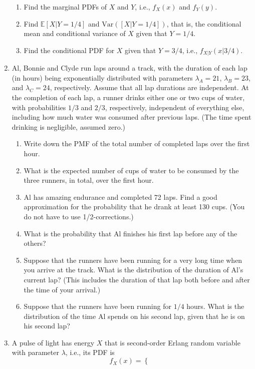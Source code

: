 \documentclass[a4paper,9pt,landscape]{extarticle}
\newcommand{\var}{\textrm{Var}}
\begin{document}
\begin{multicols*}{3}
\begin{enumerate}
\begin{enumerate}
		\item Find the marginal PDFs of $X$ and $Y$, i.e., $f_X(x)$ and $f_Y(y)$.
		\item Find $\mathds{E}\left[X|Y=1/4\right]$ and $\var(\left[X|Y=1/4\right])$, that is, the conditional mean and conditional variance of $X$ given that $Y=1/4$.
		\item Find the conditional PDF for $X$ given that $Y=3/4$, i.e., $f_{X|Y}(x|3/4)$.
	\end{enumerate}
	\item Al, Bonnie and Clyde run laps around a track, with the duration of each lap (in hours) being exponentially distributed with parameters $\lambda_A=21$, $\lambda_B=23$, and $\lambda_C=24$, respectively. Assume that all lap durations are independent. At the completion of each lap, a runner drinks either one or two cups of water, with probabilities $1/3$ and $2/3$, respectively, independent of everything else, including how much water was consumed after previous laps. (The time spent drinking is negligible, assumed zero.)
	\begin{enumerate}
		\item Write down the PMF of the total number of completed laps over the first hour.
		\item What is the expected number of cups of water to be consumed by the three runners, in total, over the first hour.
		\item Al has amazing endurance and completed 72 laps. Find a good approximation for the probability that he drank at least 130 cups. (You do not have to use 1/2-corrections.)
		\item What is the probability that Al finishes his first lap before any of the others?
		\item Suppose that the runners have been running for a very long time when you arrive at the track. What is the distribution of the duration of Al's current lap? (This includes the duration of that lap both before and after the time of your arrival.)
		\item Suppose that the runners have been running for $1/4$ hours. What is the distribution of the time Al spends on his second lap, given that he is on his second lap?
	\end{enumerate}
	\item A pulse of light has energy $X$ that is second-order Erlang random variable with parameter $\lambda$, i.e., its PDF is
	\begin{equation}
		f_X(x)=\begin{cases}

\end{cases}
\end{equation}
\end{enumerate}
\end{multicols*}
\end{document}
